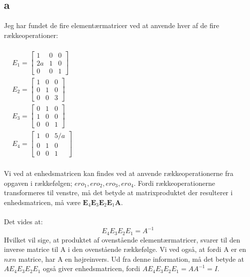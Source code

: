 \documentclass{article}
\begin{document}
\subsection*{a}
Jeg har fundet de fire elementærmatricer ved at anvende hver af de fire rækkeoperationer:
\\
\\
$\begin{aligned} & E_1=\left[\begin{array}{lll}1 & 0 & 0 \\ 2 a & 1 & 0 \\ 0 & 0 & 1\end{array}\right] \\ & E_2=\left[\begin{array}{lll}1 & 0 & 0 \\ 0 & 1 & 0 \\ 0 & 0 & 3\end{array}\right] \\ & E_3=\left[\begin{array}{lll}0 & 1 & 0 \\ 1 & 0 & 0 \\ 0 & 0 & 1\end{array}\right] \\ & E_4=\left[\begin{array}{lll}1 & 0 & 5 / a \\ 0 & 1 & 0 \\ 0 & 0 & 1\end{array}\right]\end{aligned}$
\\
\\
Vi ved at enhedsmatricen kan findes ved at anvende rækkeoperationerne fra opgaven i rækkefølgen; $ero_1, ero_2, ero_3, ero_4$. Fordi rækkeoperationerne transformeres til venstre, må det betyde at matrixproduktet der resulterer i enhedsmatricen, må være $\mathbf{E}_4 \mathbf{E}_3 \mathbf{E}_2 \mathbf{E}_1 \mathbf{A}$. 
\\
\\
Det vides at:
$$E_4 E_3 E_2 E_1=A^{-1}$$
Hvilket vil sige, at produktet af ovenstående elementærmatricer, svarer til den inverse matrice til A i den ovenstående rækkefølge. Vi ved også, at fordi A er en $nxn$ matrice, har A en højreinvers. Ud fra denne information, må det betyde at $A E_4 E_3 E_2 E_1$ også giver enhedsmatricen, fordi $A E_4 E_3 E_2 E_1=A A^{-1}=I$.
\end{document}
